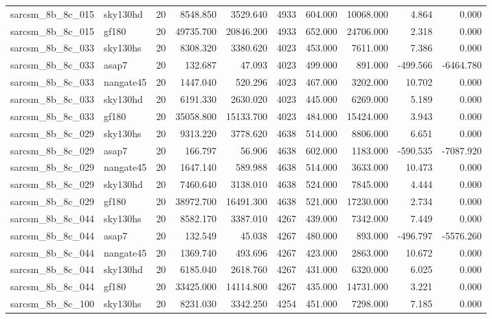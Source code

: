 \begin{tabular}{llrrrrrrrr}
sarcsm\_8b\_8c\_015 & sky130hd & 20 & 8548.850 & 3529.640 & 4933 & 604.000 & 10068.000 & 4.864 & 0.000 \\
sarcsm\_8b\_8c\_015 & gf180 & 20 & 49735.700 & 20846.200 & 4933 & 652.000 & 24706.000 & 2.318 & 0.000 \\
sarcsm\_8b\_8c\_033 & sky130hs & 20 & 8308.320 & 3380.620 & 4023 & 453.000 & 7611.000 & 7.386 & 0.000 \\
sarcsm\_8b\_8c\_033 & asap7 & 20 & 132.687 & 47.093 & 4023 & 499.000 & 891.000 & -499.566 & -6464.780 \\
sarcsm\_8b\_8c\_033 & nangate45 & 20 & 1447.040 & 520.296 & 4023 & 467.000 & 3202.000 & 10.702 & 0.000 \\
sarcsm\_8b\_8c\_033 & sky130hd & 20 & 6191.330 & 2630.020 & 4023 & 445.000 & 6269.000 & 5.189 & 0.000 \\
sarcsm\_8b\_8c\_033 & gf180 & 20 & 35058.800 & 15133.700 & 4023 & 484.000 & 15424.000 & 3.943 & 0.000 \\
sarcsm\_8b\_8c\_029 & sky130hs & 20 & 9313.220 & 3778.620 & 4638 & 514.000 & 8806.000 & 6.651 & 0.000 \\
sarcsm\_8b\_8c\_029 & asap7 & 20 & 166.797 & 56.906 & 4638 & 602.000 & 1183.000 & -590.535 & -7087.920 \\
sarcsm\_8b\_8c\_029 & nangate45 & 20 & 1647.140 & 589.988 & 4638 & 514.000 & 3633.000 & 10.473 & 0.000 \\
sarcsm\_8b\_8c\_029 & sky130hd & 20 & 7460.640 & 3138.010 & 4638 & 524.000 & 7845.000 & 4.444 & 0.000 \\
sarcsm\_8b\_8c\_029 & gf180 & 20 & 38972.700 & 16491.300 & 4638 & 521.000 & 17230.000 & 2.734 & 0.000 \\
sarcsm\_8b\_8c\_044 & sky130hs & 20 & 8582.170 & 3387.010 & 4267 & 439.000 & 7342.000 & 7.449 & 0.000 \\
sarcsm\_8b\_8c\_044 & asap7 & 20 & 132.549 & 45.038 & 4267 & 480.000 & 893.000 & -496.797 & -5576.260 \\
sarcsm\_8b\_8c\_044 & nangate45 & 20 & 1369.740 & 493.696 & 4267 & 423.000 & 2863.000 & 10.672 & 0.000 \\
sarcsm\_8b\_8c\_044 & sky130hd & 20 & 6185.040 & 2618.760 & 4267 & 431.000 & 6320.000 & 6.025 & 0.000 \\
sarcsm\_8b\_8c\_044 & gf180 & 20 & 33425.000 & 14114.800 & 4267 & 435.000 & 14731.000 & 3.221 & 0.000 \\
sarcsm\_8b\_8c\_100 & sky130hs & 20 & 8231.030 & 3342.250 & 4254 & 451.000 & 7298.000 & 7.185 & 0.000 \\

\end{tabular}
